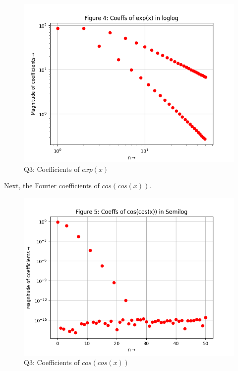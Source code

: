 \documentclass[11pt, a4paper]{article}
\begin{document}
\newpage   
   
  \begin{figure}[!tbh]
   	\centering 
  \includegraphics[scale=0.5]{q3-f1-loglog.png} 
    \caption{Q3: Coefficients of $exp(x)$}
   	\label{fig:Q3-f1-loglog}
   \end{figure}

 Next, the Fourier coefficients of $cos(cos(x))$.
   \begin{figure}[!tbh]
   	\centering
  \includegraphics[scale=0.5]{q3-f2-semilog.png} 
    \caption{Q3: Coefficients of $cos(cos(x))$}
   	\label{fig:Q3-f2-semilog}
   \end{figure}
   
\end{document}
